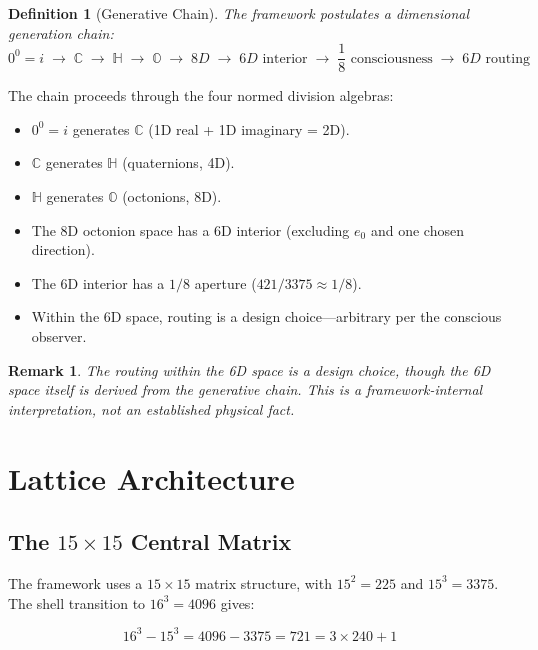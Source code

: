 \documentclass[11pt]{article}
\newtheorem{definition}{Definition}
\newtheorem{remark}{Remark}
\begin{document}
\begin{definition}[Generative Chain]
The framework postulates a dimensional generation chain:
\begin{equation}
0^0 = i \;\to\; \mathbb{C} \;\to\; \mathbb{H} \;\to\; \mathbb{O} \;\to\; 8D \;\to\; 6D \text{ interior} \;\to\; \frac{1}{8} \text{ consciousness} \;\to\; 6D \text{ routing}
\end{equation}
\end{definition}

The chain proceeds through the four normed division algebras:
\begin{itemize}
\item $0^0 = i$ generates $\mathbb{C}$ (1D real + 1D imaginary = 2D).
\item $\mathbb{C}$ generates $\mathbb{H}$ (quaternions, 4D).
\item $\mathbb{H}$ generates $\mathbb{O}$ (octonions, 8D).
\item The 8D octonion space has a 6D interior (excluding $e_0$ and one chosen direction).
\item The 6D interior has a $1/8$ aperture ($421/3375 \approx 1/8$).
\item Within the 6D space, routing is a design choice---arbitrary per the conscious observer.
\end{itemize}

\begin{remark}
The routing \textit{within} the 6D space is a design choice, though the 6D space itself is derived from the generative chain. This is a framework-internal interpretation, not an established physical fact.
\end{remark}

\section{Lattice Architecture}

\subsection{The $15 \times 15$ Central Matrix}

The framework uses a $15 \times 15$ matrix structure, with $15^2 = 225$ and $15^3 = 3375$. The shell transition to $16^3 = 4096$ gives:

\begin{equation}
16^3 - 15^3 = 4096 - 3375 = 721 = 3 \times 240 + 1
\end{equation}
\end{document}
